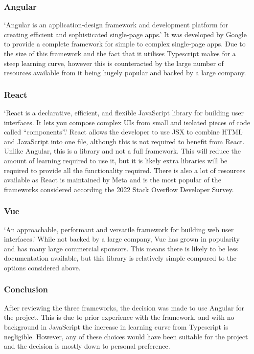 \subsubsection*{Angular}
`Angular is an application-design framework and development platform for creating efficient and sophisticated 
single-page apps.'\cite{AngularIntroductionAngular} It was developed by Google to provide a complete framework for 
simple to complex single-page apps. Due to the size of this framework and the fact that it utilises Typescript makes for
 a steep learning curve, however this is counteracted by the large number of resources available from it being hugely 
popular and backed by a large company.
\subsubsection*{React}
`React is a declarative, efficient, and flexible JavaScript library for building user interfaces. It lets you compose 
complex UIs from small and isolated pieces of code called “components”.'\cite{TutorialIntroReact} React allows the 
developer to use JSX to combine HTML and JavaScript into one file, although this is not required to benefit from React. 
Unlike Angular, this is a library and not a full framework. This will reduce the amount of learning required to use it,
but it is likely extra libraries will be required to provide all the functionality required. There is also a lot of 
resources available as React is maintained by Meta and is the most popular of the frameworks considered according the 
2022 Stack Overflow Developer Survey\cite{StackOverflowDeveloper}.
\subsubsection*{Vue}
`An approachable, performant and versatile framework for building web user interfaces.'\cite{VueJsProgressive} While not
 backed by a large company, Vue has grown in popularity and has many large commercial sponsors. This means there is 
likely to be less documentation available, but this library is relatively simple compared to the options considered 
above. 
\subsubsection*{Conclusion}
After reviewing the three frameworks, the decision was made to use Angular for the project. This is due to prior 
experience with the framework, and with no background in JavaScript the increase in learning curve from Typescript is 
negligible. However, any of these choices would have been suitable for the project and the decision is mostly down to 
personal preference.
